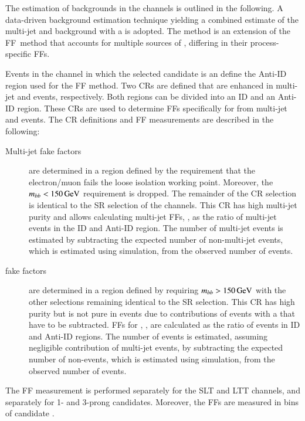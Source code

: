 The estimation of \faketauhadvis backgrounds in the \lephad channels is outlined
in the following. A data-driven background estimation technique yielding a
combined estimate of the multi-jet and \ttbar background with a \faketauhadvis
is adopted. The method is an extension of the FF~method
that accounts for multiple sources of \faketauhadvis, differing in their
process-specific FFs.

Events in the \lephad channel in which the selected \tauhadvis candidate is an
\antitau define the Anti-ID region used for the FF method. Two CRs are defined
that are enhanced in multi-jet and \ttbar events, respectively. Both regions can
be divided into an ID and an Anti-ID region. These CRs are used to determine FFs
specifically for \faketauhadvis from multi-jet and \ttbar events. The CR
definitions and FF measurements are described in the following:
\begin{description}

\item[Multi-jet fake factors] are determined in a region defined by the
  requirement that the electron/muon fails the loose isolation working
  point. Moreover, the $m_{bb} < \SI{150}{\ensuremath{\text{GeV}}}$ requirement is dropped. The
  remainder of the CR selection is identical to the SR selection of the \lephad
  channels. This CR has high multi-jet purity and allows calculating multi-jet
  FFs, \FFqcd, as the ratio of multi-jet events in the ID and Anti-ID
  region. The number of multi-jet events is estimated by subtracting the
  expected number of non-multi-jet events, which is estimated using simulation,
  from the observed number of events.

\item[\ttbar fake factors] are determined in a region defined by requiring
  $m_{bb} > \SI{150}{\ensuremath{\text{GeV}}}$ with the other selections remaining identical to the
  SR selection. This CR has high \ttbar purity but is not pure in \ttbarFakes
  events due to contributions of \ttbar events with a \truetauhadvis that have
  to be subtracted. FFs for \ttbar, \FFttbar, are calculated as the ratio of
  \ttbarFakes events in ID and Anti-ID regions. The number of \ttbarFakes events
  is estimated, assuming negligible contribution of multi-jet events, by
  subtracting the expected number of non-\ttbarFakes events, which is estimated
  using simulation, from the observed number of events.

\end{description}
The FF measurement is performed separately for the \lephad SLT and LTT channels,
and separately for 1- and 3-prong \tauhadvis candidates. Moreover, the FFs are
measured in bins of \tauhadvis candidate \pT.


